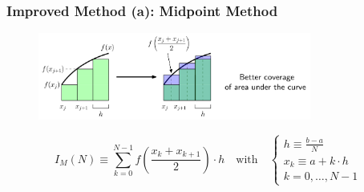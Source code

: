 \documentclass[11pt,aspectratio=169,handout]{beamer}
\begin{document}
\begin{frame}
	\frametitle{Improved Method (a): Midpoint Method}
	\begin{figure}
		\centering
		\includegraphics[width=0.8\textwidth]{fig/integration-midpoint-with-text}
	\end{figure}
	\pause
	\begin{equation*}
		I_M(N) \equiv  \sum_{k=0}^{N-1} f\left(\frac{x_k+x_{k+1}}{2}\right) \cdot h  \quad \text{with} \quad
		\begin{cases}
			h \equiv \frac{b-a}{N} \\
			x_k \equiv a + k \cdot h \\
			k = 0, \ldots, N-1
		\end{cases}
	\end{equation*}
	
	
\end{frame}
\end{document}
